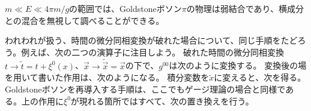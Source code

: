 $m\ll E\ll4\pi m/g$の範囲では、Goldstoneボソン$\pi$の物理は弱結合であり、横成分との混合を無視して調べることができる。

われわれが扱う、時間の微分同相変換が破れた場合について、同じ手順をたどろう。例えば、次の二つの演算子に注目しよう。
破れた時間の微分同相変換$t\to\tilde{t}=t+\xi^0(x)$、$\vec{x}\to\tilde{\vec{x}}=\vec{x}$の下で、$g^{00}$は次のように変換する。
変換後の場を用いて書いた作用は、次のようになる。
積分変数を$\tilde{x}$に変えると、次を得る。
Goldstoneボソンを再導入する手順は、ここでもゲージ理論の場合と同様である。上の作用に$\xi^0$が現れる箇所ではすべて、次の置き換えを行う。
